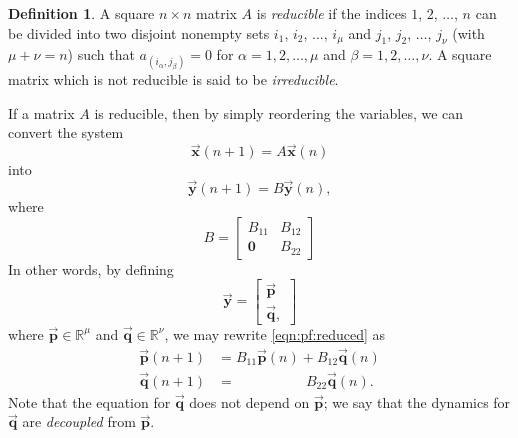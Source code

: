 \documentclass[reqno]{immbook}
\newcommand{\Real}{\mathbb{R}}
\newcommand{\BP}{\vec{\textbf{p}}}
\newcommand{\BQ}{\vec{\textbf{q}}}
\newcommand{\BX}{\vec{\textbf{x}}}
\newcommand{\BY}{\vec{\textbf{y}}}
\numberwithin{equation}{chapter}
\numberwithin{question}{section}
\numberwithin{theorem}{chapter}
\numberwithin{figure}{chapter}
\theoremstyle{definition}
\newtheorem{definition}{Definition}[section]
\begin{document}
\begin{definition}
A square $n\times n$ matrix $A$ is \emph{reducible}
if the indices $1$, $2$, $\ldots$, $n$
can be divided into two disjoint nonempty sets
$i_1$, $i_2$, $\ldots$, $i_{\mu}$ and
$j_1$, $j_2$, $\ldots$, $j_{\nu}$ (with $\mu+\nu = n$) such that
$a_{(i_{\alpha},j_{\beta})} =0$
for $\alpha=1, 2, \ldots, \mu$ and
$\beta = 1, 2, \ldots, \nu$.
A square matrix which is not reducible is said
to be \emph{irreducible}. 
\end{definition}
If a matrix $A$ is reducible, then by simply reordering the
variables, we can convert the system
\begin{equation}
   \BX(n+1)  = A\BX(n)
\label{eqn:pf:linmap}
\end{equation}
into
\begin{equation}
   \BY(n+1) = B\BY(n),
\label{eqn:pf:reduced}
\end{equation}
where
\begin{equation}
   B = \begin{bmatrix}
            B_{11} & B_{12} \\
            \textbf{0} & B_{22}
       \end{bmatrix}
\end{equation}
In other words, by defining
\begin{equation}
   \BY = \begin{bmatrix} \BP \\ \BQ,
         \end{bmatrix}
\end{equation}
where $\BP \in \Real^{\mu}$ and $\BQ \in \Real^{\nu}$,
we may rewrite
\eqref{eqn:pf:reduced} as
\begin{equation}
\begin{split}
   \BP(n+1) & = B_{11}\BP(n) + B_{12} \BQ(n) \\
   \BQ(n+1) & = \quad\quad\quad\quad\quad B_{22} \BQ(n).
\end{split}
\end{equation}
Note that the equation for $\BQ$ does not depend
on $\BP$; we say that the dynamics for $\BQ$
are \emph{decoupled} from $\BP$.
\end{document}
